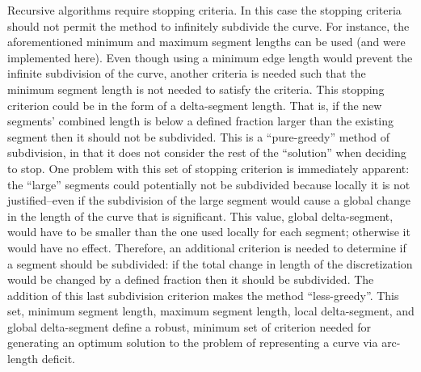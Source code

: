 Recursive algorithms require stopping criteria. In this case the stopping criteria should not permit the method to infinitely subdivide the curve. For instance, the aforementioned minimum and maximum segment lengths can be used (and were implemented here). Even though using a minimum edge length would prevent the infinite subdivision of the curve, another criteria is needed such that the minimum segment length is not needed to satisfy the criteria. This stopping criterion could be in the form of a delta-segment length. That is, if the new segments’ combined length is below a defined fraction larger than the existing segment then it should not be subdivided. This is a ``pure-greedy'' method of subdivision, in that it does not consider the rest of the ``solution'' when deciding to stop. One problem with this set of stopping criterion is immediately apparent: the ``large'' segments could potentially not be subdivided because locally it is not justified--even if the subdivision of the large segment would cause a global change in the length of the curve that is significant. This value, global delta-segment, would have to be smaller than the one used locally for each segment; otherwise it would have no effect. Therefore, an additional criterion is needed to determine if a segment should be subdivided: if the total change in length of the discretization would be changed by a defined fraction then it should be subdivided. The addition of this last subdivision criterion makes the method ``less-greedy''. This set, minimum segment length, maximum segment length, local delta-segment, and global delta-segment define a robust, minimum set of criterion needed for generating an optimum solution to the problem of representing a curve via arc-length deficit.

